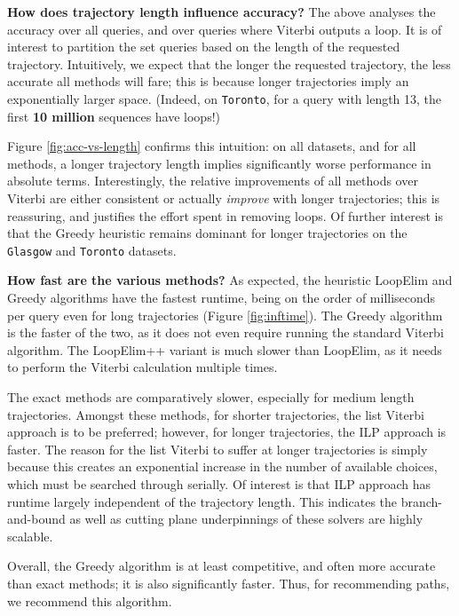 \textbf{How does trajectory length influence accuracy?}
The above analyses the accuracy over all queries, and over queries where {\sc Viterbi} outputs a loop.
It is of interest to partition the set queries based on the length of the requested trajectory.
Intuitively, we expect that the longer the requested trajectory, the less accurate all methods will fare; this is because longer trajectories imply an 
exponentially larger space.
(Indeed, on {\tt Toronto}, for a query with length 13, the first \textbf{10 million} sequences have loops!)

Figure \ref{fig:acc-vs-length} confirms this intuition:
on all datasets, and for all methods,
a longer trajectory length implies significantly worse performance in absolute terms.
Interestingly, the relative improvements of all methods over {\sc Viterbi} are either consistent or actually \emph{improve} with longer trajectories;
this is reassuring, and justifies the effort spent in removing loops.
Of further interest is that the {\sc Greedy} heuristic remains dominant for longer trajectories on the {\tt Glasgow} and {\tt Toronto} datasets.


\textbf{How fast are the various methods?}
As expected, the heuristic {\sc LoopElim} and {\sc Greedy} algorithms have the fastest runtime, being on the order of milliseconds per query even for long trajectories (Figure \ref{fig:inftime}).
The {\sc Greedy} algorithm is the faster of the two, as it does not even require running the standard Viterbi algorithm.
The {\sc LoopElim++} variant is much slower than {\sc LoopElim}, as it needs to perform the Viterbi calculation multiple times.

The exact methods are comparatively slower, especially for medium length trajectories.
Amongst these methods, for shorter trajectories, the list Viterbi approach is to be preferred;
however, for longer trajectories, the ILP approach is faster.
The reason for the list Viterbi to suffer at longer trajectories is simply because this creates an exponential increase in the number of available choices, which must be searched through serially.
Of interest is that ILP approach has runtime largely independent of the trajectory length.
This indicates the branch-and-bound as well as cutting plane underpinnings of these solvers are highly scalable.

Overall, the {\sc Greedy} algorithm is at least competitive, and often more accurate than exact methods;
it is also significantly faster.
Thus, for recommending paths, we recommend this algorithm.

